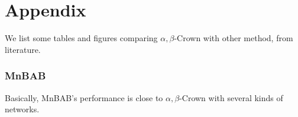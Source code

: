 \section*{Appendix}

We list some tables and figures comparing $\alpha,\beta$-Crown with other method, from literature.

\subsubsection*{MnBAB} 


Basically, MnBAB's performance is close to $\alpha,\beta$-Crown with several kinds of networks.


%
%
%
%
%
